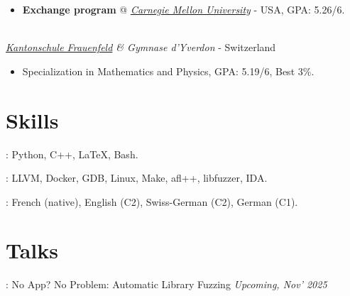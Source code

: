 \documentclass[mm, 11pt]{simple_style}
\begin{document}
\begin{resume}
\begin{itemize}
  \item \textbf{Exchange program} @
\textit{\href{https://www.ece.cmu.edu/}{Carnegie Mellon University}} - USA, GPA: 5.26/6.
\end{itemize}
\\
\textsl{\href{https://www.kanti-frauenfeld.ch/}{Kantonschule Frauenfeld} \& Gymnase d'Yverdon} - Switzerland

\begin{itemize}
  \item Specialization in Mathematics and Physics, GPA: 5.19/6, Best 3\%.
\end{itemize}

\sectionline
\section{Skills}
: Python, C++, \LaTeX, Bash.

: LLVM, Docker, GDB, Linux, Make, afl++, libfuzzer, IDA.

: French (native), English (C2), Swiss-German (C2), German (C1).\\
\sectionline
\section{Talks}
: No App? No Problem: Automatic Library Fuzzing
\hfill
\textit{Upcoming, Nov' 2025}

\pagebreak
\sectionline

\end{resume}
\end{document}
